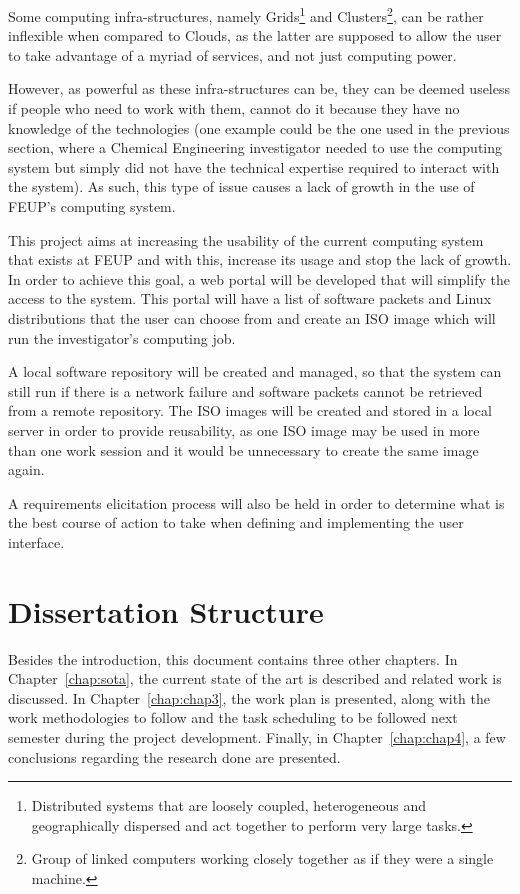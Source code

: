 Some computing infra-structures, namely Grids\footnote{Distributed systems that are loosely coupled, heterogeneous and geographically dispersed and act together to perform very large tasks.} and Clusters\footnote{Group of linked computers working closely together as if they were a single machine.}, can be rather inflexible when compared to Clouds, as the latter are supposed to allow the user to take advantage of a myriad of services, and not just computing power.~\cite{brighthub}
	
However, as powerful as these infra-structures can be, they can be deemed useless if people who need to work with them, cannot do it because they have no knowledge of the technologies (one example could be the one used in the previous section, where a Chemical Engineering investigator needed to use the computing system but simply did not have the technical expertise required to interact with the system). As such, this type of issue causes a lack of growth in the use of FEUP's computing system.

This project aims at increasing the usability of the current computing system that exists at FEUP and with this, increase its usage and stop the lack of growth. In order to achieve this goal, a web portal will be developed that will simplify the access to the system. This portal will have a list of software packets and Linux distributions that the user can choose from and create an ISO image which will run the investigator's computing job.

A local software repository will be created and managed, so that the system can still run if there is a network failure and software packets cannot be retrieved from a remote repository. The ISO images will be created and stored in a local server in order to provide reusability, as one ISO image may be used in more than one work session and it would be unnecessary to create the same image again.

A requirements elicitation process will also be held in order to determine what is the best course of action to take when defining and implementing the user interface.

\section{Dissertation Structure} \label{sec:struct}

	Besides the introduction, this document contains three other chapters. In Chapter~\ref{chap:sota}, the current state of the art is described and related work is discussed. In Chapter~\ref{chap:chap3}, the work plan is presented, along with the work methodologies to follow and the task scheduling to be followed next semester during the project development. Finally, in Chapter~\ref{chap:chap4}, a few conclusions regarding the research done are presented.
